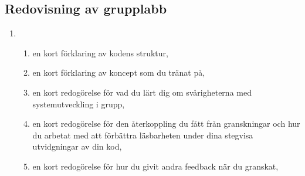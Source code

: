 
\Lab{\LabWeekELEVEN}

\begin{Goals}
\item \TODO
\end{Goals}

\begin{Preparations}
\item {}
\end{Preparations}

\subsection{Redovisning av grupplabb}

\begin{enumerate}
  \item \TODO
  \begin{enumerate}
    \item en kort förklaring av kodens struktur,
    \item en kort förklaring av koncept som du tränat på,
    \item en kort redogörelse för vad du lärt dig om svårigheterna med systemutveckling i grupp,
    \item en kort redogörelse för den återkoppling du fått från granskningar och hur du arbetat med att förbättra läsbarheten under dina stegvisa utvidgningar av din kod,
    \item en kort redogörelse för hur du givit andra feedback när du granskat,
  \end{enumerate}
\end{enumerate}


